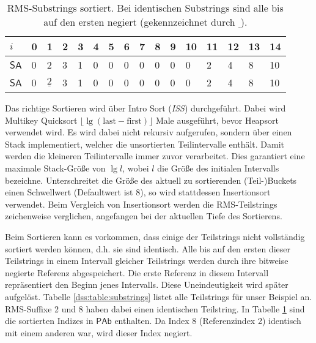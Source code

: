 \begin{table}
	\begin{tabular}{l|lllllllllllllll}
		$i$  & 0 & 1                                       & 2 & 3 & 4 & 5 & 6 & 7 & 8 & 9 & 10 & 11 & 12 & 13 & 14 \\ \hline
		$\mathsf{SA}$ & 0 & \cellcolor[HTML]{32CB00}2               & 3 & 1 & 0 & 0 & 0 & 0 & 0 & 0 & 0  & 2  & 4  & 8  & 10 \\ \hline
		$\mathsf{SA}$ & 0 & \cellcolor[HTML]{32CB00}$\underline{2}$ & 3 & 1 & 0 & 0 & 0 & 0 & 0 & 0 & 0  & 2  & 4  & 8  & 10 \\ \hline
	\end{tabular}
	\caption{RMS-Substrings sortiert. Bei identischen Substrings sind alle bis auf den ersten negiert (gekennzeichnet durch $\underline{\ }$).}
	\label{dss:table:substring-sorted}
\end{table}


Das richtige Sortieren wird über Intro Sort (\textit{ISS}) durchgeführt. Dabei wird Multikey Quicksort $\lfloor \lg (\text{last} - \text{first}) \rfloor$ Male ausgeführt, bevor Heapsort verwendet wird. Es wird dabei nicht rekursiv aufgerufen, sondern über einen Stack implementiert, welcher die unsortierten Teilintervalle enthält. Damit werden die kleineren Teilintervalle immer zuvor verarbeitet. Dies garantiert eine maximale Stack-Größe von $\lg l$, wobei $l$ die Größe des initialen Intervalls bezeichne. Unterschreitet die Größe des aktuell zu sortierenden (Teil-)Buckets einen Schwellwert (Defaultwert ist 8), so wird stattdessen Insertionsort verwendet. Beim Vergleich von Insertionsort werden die RMS-Teilstrings zeichenweise verglichen, angefangen bei der aktuellen Tiefe des Sortierens.

Beim Sortieren kann es vorkommen, dass einige der Teilstrings nicht vollständig sortiert werden können, d.h. sie sind identisch. Alle bis auf den ersten dieser Teilstrings in einem Intervall gleicher Teilstrings werden durch ihre bitweise negierte Referenz abgespeichert. Die erste Referenz in diesem Intervall repräsentiert den Beginn jenes Intervalls. Diese Uneindeutigkeit wird später aufgelöst. Tabelle \ref{dss:table:substrings} listet alle Teilstrings für unser Beispiel an. RMS-Suffixe 2 und 8 haben dabei einen identischen Teilstring. In Tabelle \ref{dss:table:substring-sorted} sind die sortierten Indizes in $\mathsf{PAb}$ enthalten. Da Index 8 (Referenzindex 2) identisch mit einem anderen war, wird dieser Index negiert.



